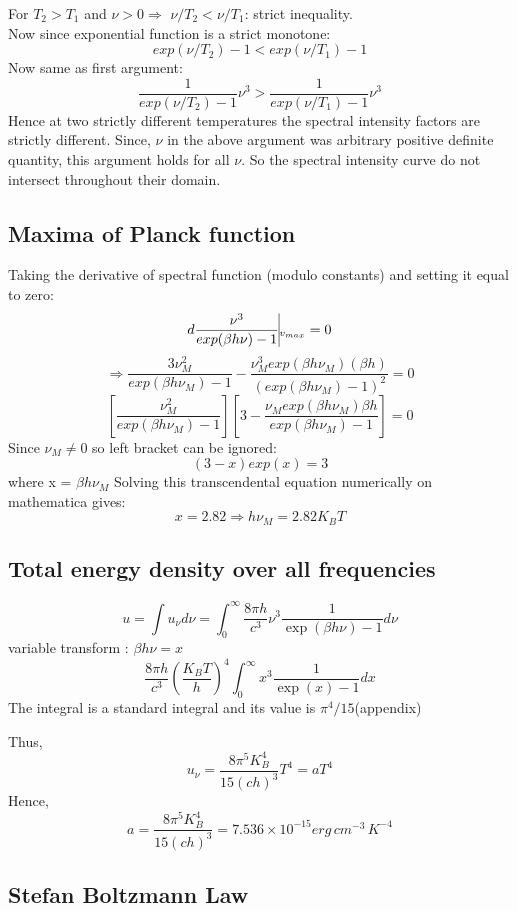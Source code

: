 \documentclass[11pt]{article}
\begin{document}
		For \( T_2 > T_1 \) and $\nu > 0 \Rightarrow $ $\nu/T_2 < \nu/T_1$: strict inequality.\\
		Now since exponential function is a strict monotone:
		\[
		exp(\nu/T_2) -1 < exp(\nu/T_1)-1
		\]
		Now same as first argument:
		\[
		\frac{1}{exp(\nu/T_2) -1} \nu^3 > \frac{1}{exp(\nu/T_1)-1} \nu^3
		\]
		Hence at two strictly different temperatures the spectral intensity factors are strictly different. Since, $\nu$ in the above argument was arbitrary positive definite quantity, this argument holds for all \(\nu\). So the spectral intensity curve do not intersect throughout their domain. 
		
		\subsection{Maxima of Planck function}
		
		Taking the derivative of spectral function (modulo constants) and setting it equal to zero:
		\[
			d \frac{\nu^3}{exp(\beta h \nu) - 1} \vline_{v_{max}}= 0			
		\]
		\[
			\Rightarrow \frac{3\nu_M^2}{exp(\beta h \nu_M) - 1} - \frac{\nu_M^3exp(\beta h \nu_M)(\beta h)}{(exp(\beta h \nu_M) - 1)^2} = 0
		\]
		\[
			[\frac{\nu_M^2}{exp(\beta h \nu_M) - 1}][3-\frac{\nu_M exp(\beta h \nu_M)\beta h}{exp(\beta h \nu_M) - 1}] = 0 
		\]
		Since $\nu_M \neq 0 $ so left bracket can be ignored:
		\[
			(3-x)exp(x) = 3
		\]where x = $\beta h \nu_M$
		Solving this transcendental equation numerically on mathematica gives:
		\[
			 x = 2.82 \Rightarrow \boxed{h \nu_M = 2.82 K_B T}
		\] 
		\subsection{Total energy density over all frequencies}
		\[
			u = \int u_\nu d\nu = \int_0^{\infty} \frac{8\pi h}{c^3} \nu^3 \frac{1}{\exp(\beta h \nu)-1} d\nu
		\]
		variable transform : $\beta h\nu = x$
		\[
			 \frac{8\pi h}{c^3}(\frac{K_B T}{ h})^4 \int_0^{\infty} x^3  \frac{1}{\exp(x)-1} dx
		\]
		The integral is a standard integral and its value is $\pi^4/15${\color{red}\Huge (appendix)}
		
		Thus,
		\[
			\boxed{u_\nu = \frac{8\pi^5K_B^4}{15(ch)^3} T^4 = a T^4}
		\]
		Hence,
		\[
			\boxed{a = \frac{8\pi^5K_B^4}{15(ch)^3} = 7.536 \times 10^{-15} erg \, cm^{-3} \, K^{-4}}
		\]
		\subsection{Stefan Boltzmann Law}
		
\end{document}
